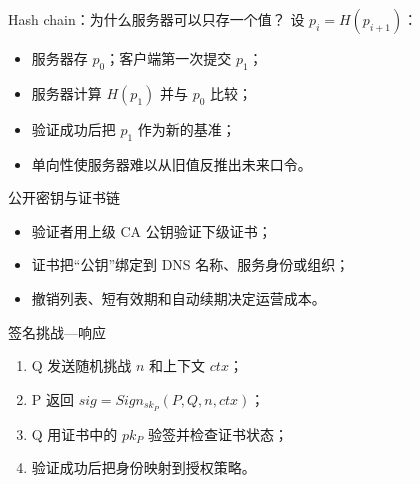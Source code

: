 \documentclass[UTF8,fontset=none,aspectratio=169,10pt]{beamer}
\begin{document}
\begin{frame}{Hash chain：为什么服务器可以只存一个值？}
设 $p_i=H(p_{i+1})$：
\begin{itemize}
  \item 服务器存 $p_0$；客户端第一次提交 $p_1$；
  \item 服务器计算 $H(p_1)$ 并与 $p_0$ 比较；
  \item 验证成功后把 $p_1$ 作为新的基准；
  \item 单向性使服务器难以从旧值反推出未来口令。
\end{itemize}
\vfill
{}
\end{frame}

\begin{frame}{公开密钥与证书链}
\begin{center}
\end{center}
\begin{itemize}
  \item 验证者用上级 CA 公钥验证下级证书；
  \item 证书把“公钥”绑定到 DNS 名称、服务身份或组织；
  \item 撤销列表、短有效期和自动续期决定运营成本。
\end{itemize}
\end{frame}

\begin{frame}{签名挑战—响应}
\begin{enumerate}
  \item Q 发送随机挑战 $n$ 和上下文 $ctx$；
  \item P 返回 $sig=Sign_{sk_P}(P,Q,n,ctx)$；
  \item Q 用证书中的 $pk_P$ 验签并检查证书状态；
  \item 验证成功后把身份映射到授权策略。
\end{enumerate}
\vfill
{}
\end{frame}
\end{document}
